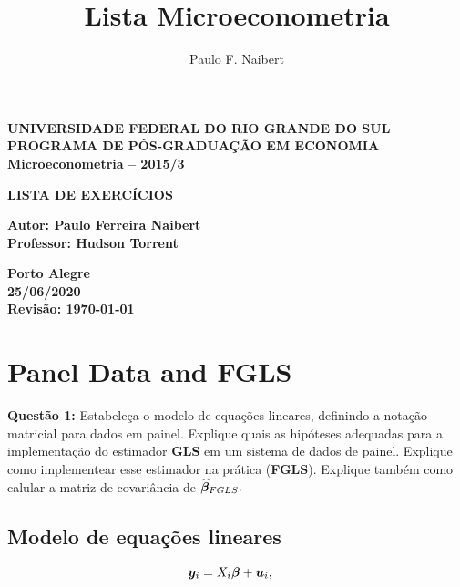 \documentclass[11pt,oneside,a4paper]{article}
\numberwithin{equation}{section}
\begin{document}
\title{Lista Microeconometria}
\author{Paulo F. Naibert}

\thispagestyle{empty}

\begin{center}
\textbf{UNIVERSIDADE FEDERAL DO RIO GRANDE DO SUL}
\\
\textbf{PROGRAMA DE PÓS-GRADUAÇÃO EM ECONOMIA}
\\
\textbf{Microeconometria -- 2015/3}

\vfill
\textbf{LISTA DE EXERCÍCIOS}

\vfill
\textbf{Autor: Paulo Ferreira Naibert } 
\\
\textbf{Professor: Hudson Torrent} 


\end{center}

\vfill

\begin{center}
\textbf{Porto Alegre \\ 25/06/2020 \\ Revisão: \today}
\end{center}

\clearpage
{}

\section{Panel Data and FGLS}

\noindent
\textbf{Questão 1:}
Estabeleça o modelo de equações lineares, definindo a notação matricial para dados em painel.
Explique quais as hipóteses adequadas para a implementação do estimador \textbf{GLS} em um sistema de dados de painel.
Explique como implementear esse estimador na prática (\textbf{FGLS}).
Explique também como calular a matriz de covariância de $\boldsymbol{\widehat{\beta}}_{FGLS}.$

\subsection*{Modelo de equações lineares} 

\vspace{-1.5 em}
\begin{align*}
	\boldsymbol{y}_{i} &= X_{i} \boldsymbol{\beta} + \boldsymbol{u}_{i},
\end{align*}
\end{document}
